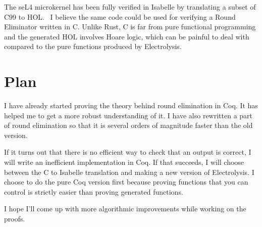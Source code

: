 \documentclass{article}
\begin{document}
The seL4 microkernel has been fully verified in Isabelle by translating a subset of C99 to HOL.\ \cite{Sel4} I believe the same code could be used for verifying a Round Eliminator written in C. Unlike Rust, C is far from pure functional programming and the generated HOL involves Hoare logic, which can be painful to deal with compared to the pure functions produced by Electrolysis.

\section{Plan}

I have already started proving the theory behind round elimination in Coq. It has helped me to get a more robust understanding of it. I have also rewritten a part of round elimination so that it is several orders of magnitude faster than the old version.

If it turns out that there is no efficient way to check that an output is correct, I will write an inefficient implementation in Coq. If that succeeds, I will choose between the C to Isabelle translation and making a new version of Electrolysis. I choose to do the pure Coq version first because proving functions that you can control is strictly easier than proving generated functions.

I hope I'll come up with more algorithmic improvements while working on the proofs.



\end{document}
